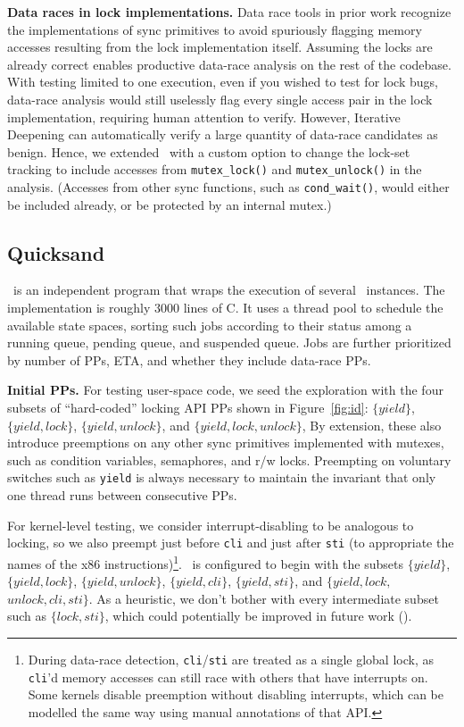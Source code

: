 {\bf Data races in lock implementations.}
Data race tools in prior work \cite{tsan,portend} recognize the implementations of sync primitives to avoid spuriously flagging memory accesses resulting from the lock implementation itself.
Assuming the locks are already correct enables productive data-race analysis on the rest of the codebase.
With testing limited to one execution, even if you wished to test for lock bugs, data-race analysis would still uselessly flag every single access pair in the lock implementation, requiring human attention to verify.
However, Iterative Deepening can automatically verify a large quantity of data-race candidates as benign.
Hence, we extended \landslide~with a custom option to change the lock-set tracking to include accesses from {\tt mutex\_lock()} and {\tt mutex\_unlock()} in the analysis. (Accesses from other sync functions, such as {\tt cond\_wait()}, would either be included already, or be protected by an internal mutex.)

\subsection{Quicksand}

\quicksand~is an independent program that wraps the execution of several \landslide~instances.
The implementation is roughly 3000 lines of C.
It uses a thread pool to schedule the available state spaces,
sorting such jobs according to their status among a running queue, pending queue, and suspended queue.
Jobs are further prioritized by number of PPs, ETA, and whether they include data-race PPs.

{\bf Initial PPs.}
For testing user-space code, we seed the exploration with the four subsets of ``hard-coded'' locking API PPs shown in Figure~\ref{fig:id}:
$\{yield\}$,
$\{yield,lock\}$,
$\{yield,unlock\}$,
and $\{yield,lock,unlock\}$,
By extension, these also introduce preemptions on any other sync primitives implemented with mutexes,
such as condition variables, semaphores, and r/w locks.
Preempting on voluntary switches such as {\tt yield} is always necessary to maintain the invariant that only one thread runs between consecutive PPs.

For kernel-level testing, we consider interrupt-disabling to be analogous to locking,
so we also preempt just before {\tt cli} and just after {\tt sti} (to appropriate the names of the x86 instructions)\footnote{
During data-race detection, {\tt cli}/{\tt sti} are treated as a single global lock,
as {\tt cli}'d memory accesses can still race with others that have interrupts on.
Some kernels disable preemption without disabling interrupts,
which can be modelled the same way using manual annotations of that API.}.
\quicksand~is configured to begin with the subsets
$\{yield\}$,
$\{yield,lock\}$,
$\{yield,unlock\}$,
$\{yield,cli\}$,
$\{yield,sti\}$,
and $\{yield,lock,$ $unlock,cli,sti\}$.
As a heuristic, we don't bother with every intermediate subset such as $\{lock,sti\}$,
which could potentially be improved in future work (\sect{\ref{sec:future}}).

